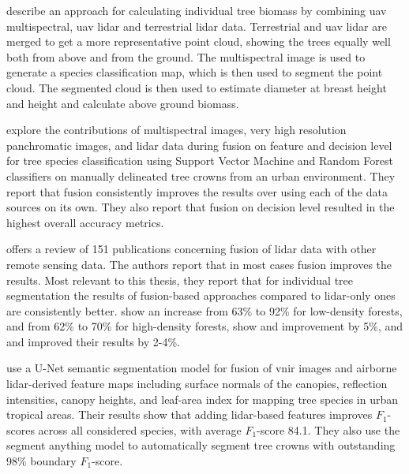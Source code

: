 \citet{lianBiomassCalculationsIndividual2022} describe an approach for calculating individual tree biomass by combining \gls{uav} multispectral, \gls{uav} \gls{lidar} and terrestrial \gls{lidar} data.
Terrestrial and \gls{uav} \gls{lidar} are merged to get a more representative point cloud, showing the trees equally well both from above and from the ground.
The multispectral image is used to generate a species classification map, which is then used to segment the point cloud.
The segmented cloud is then used to estimate diameter at breast height and height and calculate above ground biomass.

\citet{liFusionApproachesIndividual2023} explore the contributions of multispectral images, very high resolution panchromatic images, and \gls{lidar} data during fusion on feature and decision level for tree species classification using Support Vector Machine and Random Forest classifiers on manually delineated tree crowns from an urban environment.
They report that fusion consistently improves the results over using each of the data sources on its own.
They also report that fusion on decision level resulted in the highest overall accuracy metrics.

\citet{balestraLiDARDataFusion2024} offers a review of 151 publications concerning fusion of \gls{lidar} data with other remote sensing data.
The authors report that in most cases fusion improves the results.
Most relevant to this thesis, they report that for individual tree segmentation the results of fusion-based approaches compared to \gls{lidar}-only ones are consistently better.
\citet{laExtractionIndividualTree2015} show an increase from 63\% to 92\% for low-density forests, and from 62\% to 70\% for high-density forests, \citet{aubry-kientzMultisensorDataFusion2021} show and improvement by 5\%, and \citet{zhenImpactTreeOrientedGrowth2014} and \citet{arenas-corralizaAutomaticMappingTree2020} improved their results by 2-4\%.

\citet{ferreiraImprovingUrbanTree2024} use a U-Net semantic segmentation model for fusion of \gls{vnir} images and airborne \gls{lidar}-derived feature maps including surface normals of the canopies, reflection intensities, canopy heights, and leaf-area index for mapping tree species in urban tropical areas.
Their results show that adding \gls{lidar}-based features improves $F_1$-scores across all considered species, with average $F_1$-score 84.1.
They also use the segment anything model \citep{Kirillov_2023_ICCV} to automatically segment tree crowns with outstanding 98\% boundary $F_1$-score.

